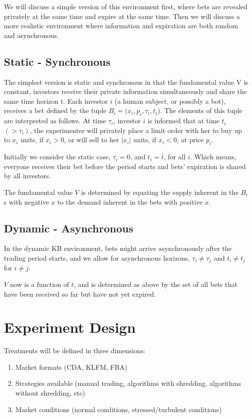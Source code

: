 \documentclass{article}
\begin{document}
We will discuss a simple version of this environment first, where bets are revealed privately at the same time and expire at the same time. Then we will discuss a more realistic environment where information and expiration are both random and asynchronous. 

\subsection{Static - Synchronous  }
The simplest version is static and synchronous in that the fundamental value V is constant, investors receive their private information simultaneously and share the same time horizon t.
Each investor $i$ (a human subject, or possibly a bot), receives a bet defined by the tuple $B_i = (x_i, p_i, \tau_i, t_i$). The elements of this tuple are interpreted as follows. At time $\tau_i$, investor $i$ is informed that at time $t_i$ $ (>\tau_i)$, the experimenter will privately place a limit order with her to buy up to $x_i$ units, if $x_i>0$, or will sell to her $|x_i|$ units, if  $x_i<0$, at price $p_i$. 

Initially we consider the static case, $\tau_i = 0$, and  $t_i = \bar{t}$, for all $i$. Which means, everyone receives their bet before the period starts and bets' expiration is shared by all investors.

The fundamental value $V$ is determined by equating the supply inherent in the $B_i$s with negative $x$ to the demand inherent in the bets with positive $x$.

\subsection{Dynamic - Asynchronous }
In the dynamic KB environment,  bets might arrive asynchronously after the trading period starts, and we allow for asynchronous horizons, $\tau_i \neq \tau_j$ and $t_i \neq t_j$ for $i\neq j$.

$V$ now is a function of $t$, and is determined as above by the set of all bets that have been received so far but have not yet expired. 


\section{Experiment Design}

Treatments will be defined in three dimensions:

\begin{enumerate}
    \item Market formats (CDA, KLFM, FBA)
    \item Strategies available (manual trading, algorithms with shredding, algorithms without shredding, etc)
    \item Market conditions (normal conditions, stressed/turbulent conditions)
\end{enumerate}
\end{document}
